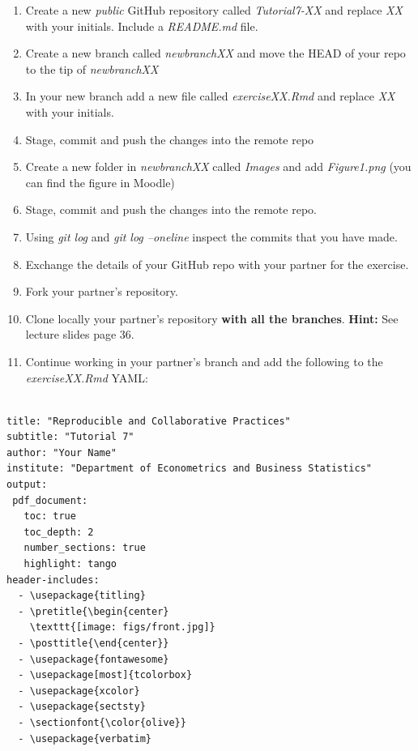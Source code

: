 \documentclass[
]{article}
\providecommand{\tightlist}{%
  \setlength{\itemsep}{0pt}\setlength{\parskip}{0pt}}
\begin{document}
\begin{enumerate}
\def\labelenumi{\arabic{enumi}.}
\tightlist
\item
  Create a new \emph{public} GitHub repository called
  \emph{Tutorial7-XX} and replace \emph{XX} with your initials. Include
  a \emph{README.md} file.
\item
  Create a new branch called \emph{newbranchXX} and move the HEAD of
  your repo to the tip of \emph{newbranchXX}
\item
  In your new branch add a new file called \emph{exerciseXX.Rmd} and
  replace \emph{XX} with your initials.
\item
  Stage, commit and push the changes into the remote repo
\item
  Create a new folder in \emph{newbranchXX} called \emph{Images} and add
  \emph{Figure1.png} (you can find the figure in Moodle)
\item
  Stage, commit and push the changes into the remote repo.
\item
  Using \emph{git log} and \emph{git log --oneline} inspect the commits
  that you have made.
\item
  Exchange the details of your GitHub repo with your partner for the
  exercise.
\item
  Fork your partner's repository.
\item
  Clone locally your partner's repository \textbf{with all the
  branches}. \textbf{Hint:} See lecture slides page 36.
\item
  Continue working in your partner's branch and add the following to the
  \emph{exerciseXX.Rmd} YAML:
\end{enumerate}

\begin{tcolorbox}
\begin{verbatim}

title: "Reproducible and Collaborative Practices"
subtitle: "Tutorial 7"
author: "Your Name"
institute: "Department of Econometrics and Business Statistics"
output: 
 pdf_document:
   toc: true
   toc_depth: 2
   number_sections: true
   highlight: tango
header-includes: 
  - \usepackage{titling}
  - \pretitle{\begin{center}
    \texttt{[image: figs/front.jpg]}
  - \posttitle{\end{center}}
  - \usepackage{fontawesome}
  - \usepackage[most]{tcolorbox}
  - \usepackage{xcolor}
  - \usepackage{sectsty}
  - \sectionfont{\color{olive}}
  - \usepackage{verbatim}
  
\end{verbatim}
\end{tcolorbox}
\end{document}
